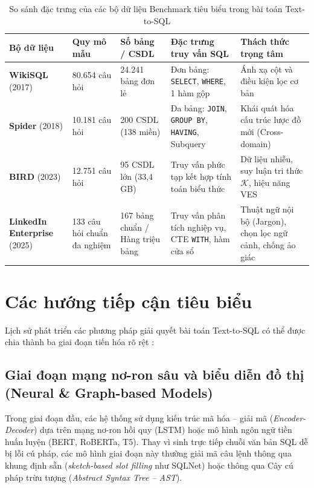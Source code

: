 \documentclass[12pt,a4paper]{report}
\begin{document}
\begin{table}[H]
\centering
\caption{So sánh đặc trưng của các bộ dữ liệu Benchmark tiêu biểu trong bài toán Text-to-SQL}
\label{tab:benchmarks_comparison}
\renewcommand{\arraystretch}{1.25}
\small
\begin{tabular}{@{}p{2.6cm}p{2.2cm}p{2.3cm}p{3.6cm}p{3.6cm}@{}}
\toprule
\textbf{Bộ dữ liệu} & \textbf{Quy mô mẫu} & \textbf{Số bảng / CSDL} & \textbf{Đặc trưng truy vấn SQL} & \textbf{Thách thức trọng tâm} \\
\midrule
\textbf{WikiSQL} \cite{zhong2017wikisql} (2017) & 80.654 câu hỏi & 24.241 bảng đơn lẻ & Đơn bảng: \texttt{SELECT}, \texttt{WHERE}, 1 hàm gộp & Ánh xạ cột và điều kiện lọc cơ bản \\
\addlinespace
\textbf{Spider} \cite{yu2018spider} (2018) & 10.181 câu hỏi & 200 CSDL (138 miền) & Đa bảng: \texttt{JOIN}, \texttt{GROUP BY}, \texttt{HAVING}, Subquery & Khái quát hóa cấu trúc lược đồ mới (Cross-domain) \\
\addlinespace
\textbf{BIRD} \cite{li2023bird} (2023) & 12.751 câu hỏi & 95 CSDL lớn (33,4 GB) & Truy vấn phức tạp kết hợp tính toán biểu thức & Dữ liệu nhiễu, suy luận tri thức $\mathcal{K}$, hiệu năng VES \\
\addlinespace
\textbf{LinkedIn Enterprise} \cite{chen2025enterprise} (2025) & 133 câu hỏi chuẩn đa nghiệm & 167 bảng chuẩn / Hàng triệu bảng & Truy vấn phân tích nghiệp vụ, CTE \texttt{WITH}, hàm cửa sổ & Thuật ngữ nội bộ (Jargon), chọn lọc ngữ cảnh, chống ảo giác \\
\bottomrule
\end{tabular}
\end{table}

\section{Các hướng tiếp cận tiêu biểu}

Lịch sử phát triển các phương pháp giải quyết bài toán Text-to-SQL có thể được chia thành ba giai đoạn tiến hóa rõ rệt \cite{wang2025macsql}:

\subsection{Giai đoạn mạng nơ-ron sâu và biểu diễn đồ thị (Neural \& Graph-based Models)}
Trong giai đoạn đầu, các hệ thống sử dụng kiến trúc mã hóa -- giải mã (\textit{Encoder-Decoder}) dựa trên mạng nơ-ron hồi quy (LSTM) hoặc mô hình ngôn ngữ tiền huấn luyện (BERT, RoBERTa, T5). Thay vì sinh trực tiếp chuỗi văn bản SQL dễ bị lỗi cú pháp, các mô hình giai đoạn này thường giải mã câu lệnh thông qua khung định sẵn (\textit{sketch-based slot filling} như SQLNet) hoặc thông qua Cây cú pháp trừu tượng (\textit{Abstract Syntax Tree -- AST}).
\end{document}
